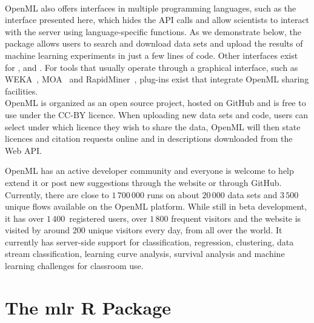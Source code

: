 \paragraph{
}
OpenML also offers interfaces in multiple programming languages, such as the 
 interface presented here, which hides the API calls and allow 
scientists to interact with the server using language-specific functions. As we 
demonstrate below, the  package allows  users to search 
and download data sets and upload the results of machine learning experiments in 
just a few lines of code. Other interfaces exist for ,  
and . For tools that usually operate through a graphical 
interface, such as  WEKA~\citep{Hall:2009p14495}, MOA~\citep{Bifet:2010p28524} 
and RapidMiner~\citep{RCOMM2013}, plug-ins exist that integrate OpenML sharing 
facilities.\\

\noindent OpenML is organized as an open source project, hosted on 
GitHub 
and is free to use under the 
CC-BY licence. When uploading new data sets and code, users can select under 
which licence they wish to share the data, OpenML will then state licences and 
citation requests online and in descriptions downloaded from the Web API. 

OpenML has an active developer community and everyone is welcome to 
help extend it or post new suggestions through the website or through GitHub.
Currently, there are close to $1\,700\,000$ runs on about $20\,000$ data 
sets and $3\,500$ unique flows available on the OpenML platform. While still 
in beta development, it has over 
$1\,400$~registered users, over $1\,800$ frequent visitors and the website is 
visited by around 200 unique visitors every day, from all over the world. It 
currently has server-side support for classification, regression, clustering, 
data stream classification, learning curve analysis, survival analysis and 
machine learning challenges for classroom use.




\section{The mlr R Package}
\label{sec:mlr}


